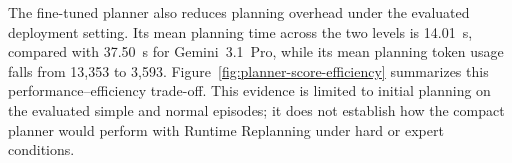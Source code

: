 The fine-tuned planner also reduces planning overhead under the evaluated
deployment setting. Its mean planning time across the two levels is 14.01~s,
compared with 37.50~s for Gemini~3.1~Pro, while its mean planning token usage
falls from 13,353 to 3,593. Figure~\ref{fig:planner-score-efficiency} summarizes
this performance--efficiency trade-off. This evidence is limited to initial
planning on the evaluated simple and normal episodes; it does not establish how
the compact planner would perform with Runtime Replanning under hard or expert
conditions.

\FloatBarrier

\endinput
